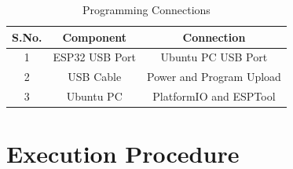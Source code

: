 \documentclass[12pt,a4paper]{article}
\begin{document}
\begin{table}[h]
\centering
\begin{tabular}{|c|c|c|}
\hline
\textbf{S.No.} & \textbf{Component} & \textbf{Connection} \\ \hline
1 & ESP32 USB Port & Ubuntu PC USB Port \\ \hline
2 & USB Cable & Power and Program Upload \\ \hline
3 & Ubuntu PC & PlatformIO and ESPTool \\ \hline
\end{tabular}
\caption{Programming Connections}
\label{tab:programming}
\end{table}
\section*{Execution Procedure}
\end{document}
